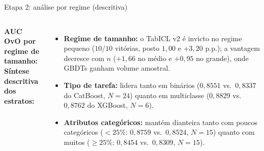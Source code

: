 \documentclass[aspectratio=169,11pt]{beamer}
\begin{document}
\begin{frame}{Etapa 2: análise por regime (descritiva)}
    \begin{columns}[T,onlytextwidth]
        \footnotesize
        \textbf{AUC OvO por regime de tamanho:}\\[0.3em]
        \textbf{\footnotesize Síntese descritiva dos estratos:}\\[0.2em]
        \begin{itemize}
            \scriptsize
            \setlength{\itemsep}{2.5pt}
            \item \textbf{Regime de tamanho:} o TabICL v2 é invicto no regime pequeno ($10/10$ vitórias, posto $1{,}00$ e $+3{,}20\text{ p.p.}$); a vantagem decresce com $n$ ($+1{,}66$ no médio e $+0{,}95$ no grande), onde GBDTs ganham volume amostral.
            \item \textbf{Tipo de tarefa:} lidera tanto em binários ($0{,}8551$ vs.\ $0{,}8337$ do CatBoost, $N=24$) quanto em multiclasse ($0{,}8829$ vs.\ $0{,}8762$ do XGBoost, $N=6$).
            \item \textbf{Atributos categóricos:} mantém dianteira tanto com poucos categóricos ($<25\%$: $0{,}8759$ vs.\ $0{,}8524$, $N=15$) quanto com muitos ($\ge 25\%$: $0{,}8454$ vs.\ $0{,}8309$, $N=15$).

\end{itemize}
\end{columns}
\end{frame}
\end{document}
